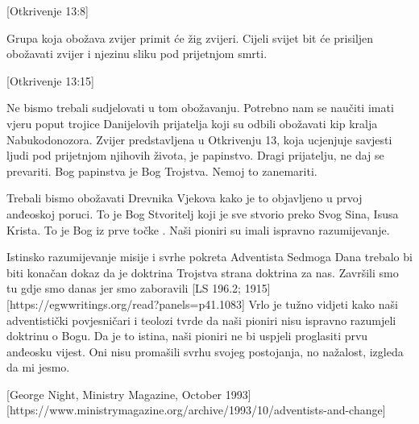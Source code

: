 [Otkrivenje 13:8]

Grupa koja obožava zvijer primit će žig zvijeri. Cijeli svijet bit će prisiljen obožavati zvijer i njezinu sliku pod prijetnjom smrti.

[Otkrivenje 13:15]

Ne bismo trebali sudjelovati u tom obožavanju. Potrebno nam se naučiti imati vjeru poput trojice Danijelovih prijatelja koji su odbili obožavati kip kralja Nabukodonozora. Zvijer predstavljena u Otkrivenju 13, koja ucjenjuje savjesti ljudi pod prijetnjom njihovih života, je papinstvo. Dragi prijatelju, ne daj se prevariti. Bog papinstva je Bog Trojstva. Nemoj to zanemariti.

Trebali bismo obožavati Drevnika Vjekova kako je to objavljeno u prvoj anđeoskoj poruci. To je Bog Stvoritelj koji je sve stvorio preko Svog Sina, Isusa Krista. To je Bog iz prve točke . Naši pioniri su imali ispravno razumijevanje.

Istinsko razumijevanje misije i svrhe pokreta Adventista Sedmoga Dana trebalo bi biti konačan dokaz da je doktrina Trojstva strana doktrina za nas. Završili smo tu gdje smo danas jer smo zaboravili [LS 196.2; 1915][https://egwwritings.org/read?panels=p41.1083] Vrlo je tužno vidjeti kako naši adventistički povjesničari i teolozi tvrde da naši pioniri nisu ispravno razumjeli doktrinu o Bogu. Da je to istina, naši pioniri ne bi uspjeli proglasiti prvu anđeosku vijest. Oni nisu promašili svrhu svojeg postojanja, no nažalost, izgleda da mi jesmo.

[George Night, Ministry Magazine, October 1993][https://www.ministrymagazine.org/archive/1993/10/adventists-and-change]





